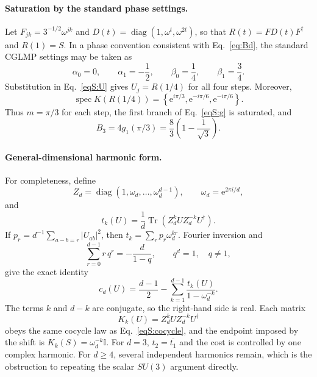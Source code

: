 \documentclass[aps,prl,reprint,superscriptaddress,nofootinbib]{revtex4-2}
\newcommand{\Tr}{\operatorname{Tr}}
\newcommand{\diag}{\operatorname{diag}}
\newcommand{\spec}{\operatorname{spec}}
\newcommand{\e}{\mathrm{e}}
\newcommand{\id}{\mathbb{I}}
\begin{document}
\paragraph{Saturation by the standard phase settings.}
Let $F_{jk}=3^{-1/2}\omega^{jk}$ and $D(t)=\diag(1,\omega^t,\omega^{2t})$, so that $R(t)=FD(t)F^\dagger$ and $R(1)=S$. In a phase convention consistent with Eq.~\eqref{eq:Bd}, the standard CGLMP settings may be taken as
\begin{equation}
\alpha_0=0,\qquad \alpha_1=-\frac12,\qquad
\beta_0=\frac14,\qquad \beta_1=\frac34.
\label{eqS:phases}
\end{equation}
Substitution in Eq.~\eqref{eqS:U} gives $U_j=R(1/4)$ for all four steps. Moreover,
\begin{equation}
\spec K(R(1/4))=
\left\{\e^{i\pi/3},\e^{-i\pi/6},\e^{-i\pi/6}\right\}.
\label{eqS:spectrum}
\end{equation}
Thus $m=\pi/3$ for each step, the first branch of Eq.~\eqref{eqS:g} is saturated, and
\begin{equation}
B_3=4g_1(\pi/3)=\frac83\left(1-\frac1{\sqrt3}\right).
\end{equation}


\paragraph{General-dimensional harmonic form.}
For completeness, define
\begin{equation}
Z_d=\diag(1,\omega_d,\ldots,\omega_d^{d-1}),
\qquad \omega_d=\e^{2\pi i/d},
\end{equation}
and
\begin{equation}
t_k(U)=\frac1d\Tr\!\left(Z_d^kUZ_d^{-k}U^\dagger\right).
\end{equation}
If $p_r=d^{-1}\sum_{a-b=r}|U_{ab}|^2$, then $t_k=\sum_rp_r\omega_d^{kr}$. Fourier inversion and
\begin{equation}
\sum_{r=0}^{d-1}r\,q^r=-\frac{d}{1-q},\qquad q^d=1,\quad q\neq1,
\end{equation}
give the exact identity
\begin{equation}
c_d(U)=\frac{d-1}{2}
-\sum_{k=1}^{d-1}\frac{t_k(U)}{1-\omega_d^{-k}}.
\label{eqS:general}
\end{equation}
The terms $k$ and $d-k$ are conjugate, so the right-hand side is real. Each matrix
\begin{equation}
K_k(U)=Z_d^kUZ_d^{-k}U^\dagger
\end{equation}
obeys the same cocycle law as Eq.~\eqref{eqS:cocycle}, and the endpoint imposed by the shift is $K_k(S)=\omega_d^{-k}\id$. For $d=3$, $t_2=\overline{t_1}$ and the cost is controlled by one complex harmonic. For $d\geq4$, several independent harmonics remain, which is the obstruction to repeating the scalar $SU(3)$ argument directly.
\end{document}
